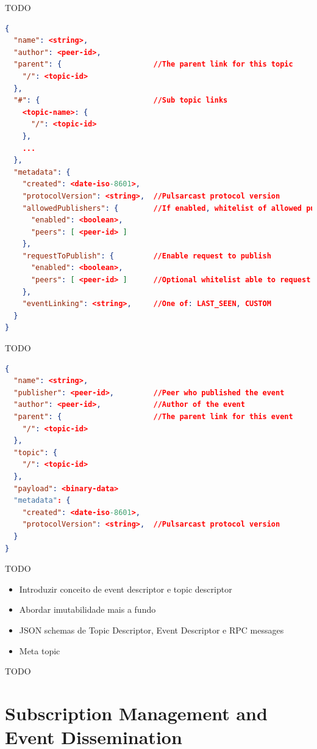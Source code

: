 TODO

\begin{lstlisting}[language=JSON,caption={Topic descriptor schema in a JSON based format},label={topic-descriptor},captionpos=b]
{
  "name": <string>,
  "author": <peer-id>,
  "parent": {                     //The parent link for this topic
    "/": <topic-id>
  },
  "#": {                          //Sub topic links
    <topic-name>: {
      "/": <topic-id>
    },
    ...
  },
  "metadata": {
    "created": <date-iso-8601>,
    "protocolVersion": <string>,  //Pulsarcast protocol version
    "allowedPublishers": {        //If enabled, whitelist of allowed publishers
      "enabled": <boolean>,
      "peers": [ <peer-id> ]
    },
    "requestToPublish": {         //Enable request to publish
      "enabled": <boolean>,
      "peers": [ <peer-id> ]      //Optional whitelist able to request
    },
    "eventLinking": <string>,     //One of: LAST_SEEN, CUSTOM
  }
}
\end{lstlisting}
 
TODO

\begin{lstlisting}[language=JSON,caption={Event descriptor schema in a JSON based format},label={event-descriptor},captionpos=b]
{
  "name": <string>,
  "publisher": <peer-id>,         //Peer who published the event
  "author": <peer-id>,            //Author of the event
  "parent": {                     //The parent link for this event
    "/": <topic-id>
  },
  "topic": {
    "/": <topic-id>
  },
  "payload": <binary-data>
  "metadata": {
    "created": <date-iso-8601>,
    "protocolVersion": <string>,  //Pulsarcast protocol version
  }
}
\end{lstlisting}

TODO

\begin{itemize}
\item Introduzir conceito de event descriptor e topic descriptor
\item Abordar imutabilidade mais a fundo
\item JSON schemas de Topic Descriptor, Event Descriptor e RPC messages
\item Meta topic
\end{itemize}

TODO

\section{Subscription Management and Event Dissemination}\label{subscription-management-event-dissemination}

